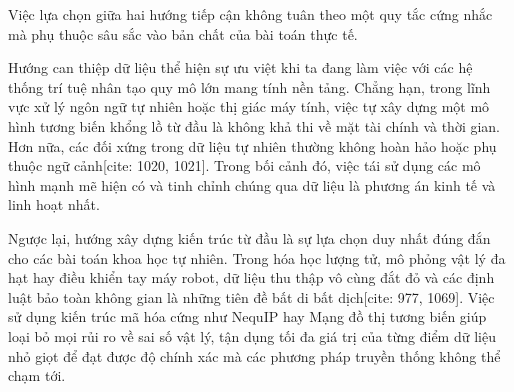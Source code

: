 Việc lựa chọn giữa hai hướng tiếp cận không tuân theo một quy tắc cứng nhắc mà phụ thuộc sâu sắc vào bản chất của bài toán thực tế. 

Hướng can thiệp dữ liệu thể hiện sự ưu việt khi ta đang làm việc với các hệ thống trí tuệ nhân tạo quy mô lớn mang tính nền tảng. Chẳng hạn, trong lĩnh vực xử lý ngôn ngữ tự nhiên hoặc thị giác máy tính, việc tự xây dựng một mô hình tương biến khổng lồ từ đầu là không khả thi về mặt tài chính và thời gian. Hơn nữa, các đối xứng trong dữ liệu tự nhiên thường không hoàn hảo hoặc phụ thuộc ngữ cảnh[cite: 1020, 1021]. Trong bối cảnh đó, việc tái sử dụng các mô hình mạnh mẽ hiện có và tinh chỉnh chúng qua dữ liệu là phương án kinh tế và linh hoạt nhất.

Ngược lại, hướng xây dựng kiến trúc từ đầu là sự lựa chọn duy nhất đúng đắn cho các bài toán khoa học tự nhiên. Trong hóa học lượng tử, mô phỏng vật lý đa hạt hay điều khiển tay máy robot, dữ liệu thu thập vô cùng đắt đỏ và các định luật bảo toàn không gian là những tiên đề bất di bất dịch[cite: 977, 1069]. Việc sử dụng kiến trúc mã hóa cứng như NequIP hay Mạng đồ thị tương biến giúp loại bỏ mọi rủi ro về sai số vật lý, tận dụng tối đa giá trị của từng điểm dữ liệu nhỏ giọt để đạt được độ chính xác mà các phương pháp truyền thống không thể chạm tới.

\clearpage
